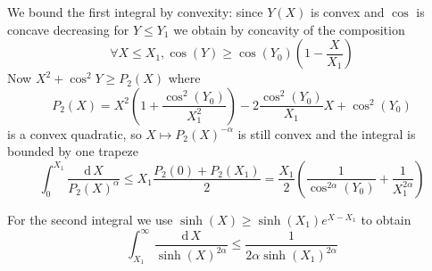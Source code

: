 \documentclass[main.tex]{subfiles}
\renewcommand\d{\mathrm{d}\,}
\newcommand\abs[1]{\left|#1\right|}
\begin{document}
  We bound the first integral by convexity:
  since $Y(X)$ is convex and $\cos$ is concave decreasing for $Y\leq Y_1$ we
  obtain by concavity of the composition
  \begin{equation}
      \forall X\leq X_1, \cos(Y)\geq \cos(Y_0)(1-\frac{X}{X_1})
  \end{equation}
  Now $X^2+\cos^2Y\geq P_2(X)$ where
  \begin{equation}
     P_2(X) = X^2(1+\frac{\cos^2(Y_0)}{X_1^2})-2\frac{\cos^2(Y_0)}{X_1}X+\cos^2(Y_0)
  \end{equation}
  is a convex quadratic, so $X\mapsto P_2(X)^{-α}$ is still convex and the integral
  is bounded by one trapeze
  \begin{equation}
      \int_0^{X_1}\frac{\d X}{P_2(X)^α}\leq X_1\frac{P_2(0)+P_2(X_1)}2
      = \frac{X_1}2\left(\frac1{\cos^{2α}(Y_0)}+\frac1{X_1^{2α}}\right)
  \end{equation}

  For the second integral we use
  $\sinh(X)\geq\sinh(X_1)e^{X-X_1}$ to obtain
  \begin{equation}
      \int_{X_1}^\infty \frac{\d X}{\sinh(X)^{2α}} \leq \frac1{2α\sinh(X_1)^{2α}}
  \end{equation}

\iffalse
  \begin{align}
      \sinh(x+iy) &= \sinh x\cos y+i\cosh x\sin y\\
      \cosh(x+iy) &= \cosh x\cos y+i\sinh x\sin y
  \end{align}
  so that writing $λ\sinh(t+iτ)=X+iY$ we express the integral in terms
  of $X,Y$ with
  \begin{align}
      X &= λ\sinh t\cosτ\\
      Y &= λ\cosh t\sinτ\\
      Y^2 =λ^2(\sin^2τ+\tan^2 τX^2)\\
      λ\cosh(t+iτ) &= λ\cosh t\cos τ+iλ\sinh t\sinτ \\
                     &= Y/\tan(τ) + i X\tan(τ)\\
      \abs{\cosh(X+iY)}^2
      &= \cosh^2 X\cos^2 Y+\sinh^2 X\sin^2 Y \label{eq:boundchcos}\\
      &= \sinh^2 X + \cos^2 Y \label{eq:boundchsh}
  \end{align}
\fi
      
\end{document}
